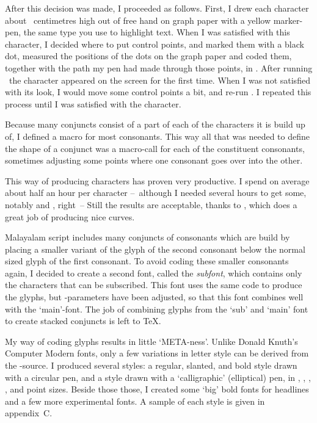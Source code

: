 After this decision was made, I proceeded as follows. First, I drew 
each character about {}~centimetres high out of free hand on graph 
paper with a yellow marker-pen, the same type you use to highlight 
text. When I was satisfied with this character, I decided where to put 
control points, and marked them with a black dot, measured the 
positions of the dots on the graph paper and coded them, together with 
the path my pen had made through those points, in \MF. After running 
\MF\ the character appeared on the screen for the first time. When I 
was not satisfied with its look, I would move some control points a 
bit, and re-run \MF. I repeated this process until I was satisfied 
with the character.

Because many conjuncts consist of a part of each of the characters it 
is build up of, I defined a macro for most consonants. This way all 
that was needed to define the shape of a conjunct was a macro-call for 
each of the constituent consonants, sometimes adjusting some points 
where one consonant goes over into the other.

This way of producing characters has proven very productive. I spend 
on average about half an hour per character --~although I needed 
several hours to get some, notably {\mm {}} and {\mm {}}, right~-- Still the 
results are acceptable, thanks to \MF, which does a great job of 
producing nice curves.

Malayalam script includes many conjuncts of consonants which are build 
by placing a smaller variant of the glyph of the second consonant 
below the normal sized glyph of the first consonant. To avoid coding 
these smaller consonants again, I decided to create a second font, 
called the {\it subfont\/}, which contains only the characters that 
can be subscribed. This font uses the same code to produce the glyphs, 
but \MF-parameters have been adjusted, so that this font combines well 
with the `main'-font. The job of combining glyphs from the `sub' and 
`main' font to create stacked conjuncts is left to \TeX.

My way of coding glyphs results in little `{\logo META}-ness'. Unlike 
Donald Knuth's Computer Modern fonts, only a few variations in letter 
style can be derived from the \MF-source. I produced several styles: a 
regular, slanted, and bold style drawn with a circular pen, and a 
style drawn with a `calligraphic' (elliptical) pen, in {}, {}, 
{}, {}, and {} point sizes. Beside those those, I 
created some `big' bold fonts for headlines and a few more 
experimental fonts. A sample of each style is given in appendix~C.

